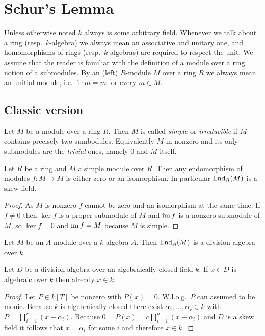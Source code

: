 \chapter{Schur’s Lemma}
Unless otherwise noted $k$ always is some arbitrary field. Whenever we talk about a ring (resp.\ $k$-algebra) we always mean an associative and unitary one, and homomorphisms of rings (resp.\ $k$-algebras) are required to respect the unit. We assume that the reader is familiar with the definition of a module over a ring notion of a submodules. By an (left) $R$-module $M$ over a ring $R$ we always mean an unitial module, i.e.\ $1 \cdot m = m$ for every $m \in M$.





\section{Classic version}


\begin{defi}
 Let $M$ be a module over a ring $R$. Then $M$ is called \emph{simple} or \emph{irreducible} if $M$ contains precisely two sumbodules. Equivalently $M$ in nonzero and its only submodules are the \emph{trivial} ones, namely $0$ and $M$ itself.
\end{defi}


\begin{lem}[Schur] \label{lem: Schur general part about skew field}
 Let $R$ be a ring and $M$ a simple module over $R$. Then any endomorphism of modules $f \colon M \to M$ is either zero or an isomorphism. In particular $\operatorname{End}_R(M)$ is a skew field.
\end{lem}
\begin{proof}
 As $M$ is nonzero $f$ cannot be zero and an isomorphism at the same time. If $f \neq 0$ then $\ker f$ is a proper submodule of $M$ and $\operatorname{im} f$ is a nonzero submodule of $M$, so $\ker f = 0$ and $\operatorname{im} f = M$ because $M$ is simple.
\end{proof}


\begin{cor}
 Let $M$ be an $A$-module over a $k$-algebra $A$. Then $\operatorname{End}_A(M)$ is a division algebra over $k$.
\end{cor}


\begin{lem}\label{lem: algebraic elements over algebraically closed fields}
 Let $D$ be a division algebra over an algebraically closed field $k$. If $x \in D$ is algebraic over $k$ then already $x \in k$.
\end{lem}
\begin{proof}
 Let $P \in k[T]$ be nonzero with $P(x) = 0$. W.l.o.g.\ $P$ can assumed to be monic. Because $k$ is algebraically closed there exist $\alpha_1, \dotsc, \alpha_r \in k$ with $P = \prod_{i=1}^r (x-\alpha_i)$. Because $0 = P(x) = c \prod_{i=1}^n (x-\alpha_i)$ and $D$ is a skew field it follows that $x = \alpha_i$ for some $i$ and therefore $x \in k$.
\end{proof}


